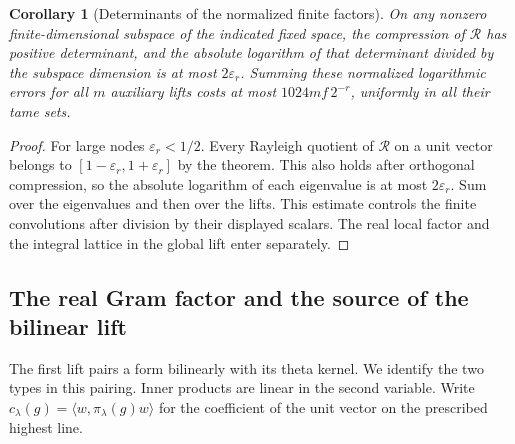 \documentclass[a4paper,11pt]{article}
\newtheorem{corollary}[proposition]{Corollary}
\theoremstyle{definition}
\theoremstyle{remark}
\numberwithin{equation}{section}
\begin{document}
\begin{corollary}[Determinants of the normalized finite factors]\leavevmode
\label{cor:finitedet709}
On any nonzero finite-dimensional subspace of the indicated
fixed space, the compression of \(\mathcal R\) has positive
determinant, and the absolute logarithm of that determinant
divided by the subspace dimension is at most
\(2\varepsilon_r\). Summing these normalized logarithmic
errors for all \(m\) auxiliary lifts costs at most
\(1024mf\,2^{-r}\), uniformly in all their tame sets.
\end{corollary}
\begin{proof}
For large nodes \(\varepsilon_r<1/2\). Every Rayleigh quotient
of \(\mathcal R\) on a unit vector belongs to
\([1-\varepsilon_r,1+\varepsilon_r]\) by the theorem. This
also holds after orthogonal compression, so the absolute
logarithm of each eigenvalue is at most \(2\varepsilon_r\).
Sum over the eigenvalues and then over the lifts. This
estimate controls the finite convolutions after division by
their displayed scalars. The real local factor and the
integral lattice in the global lift enter separately.
\end{proof}


\subsection{The real Gram factor and the source of the bilinear lift}
\label{sec:realgram710}

The first lift pairs a form bilinearly with its theta
kernel. We identify the two types in this pairing. Inner
products are linear in the second variable. Write
\(c_\lambda(g)=\langle w,\pi_\lambda(g)w\rangle\) for the
coefficient of the unit vector on the prescribed highest line.
\end{document}
